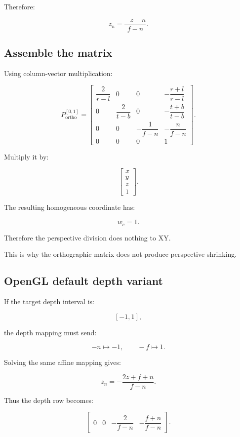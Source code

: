 Therefore:

\[
 \boxed{ z_n=\frac{-z-n}{f-n} }.
\]

\subsection{Assemble the matrix}\label{02-foundations-ii-ch033-assemble-the-matrix}

Using column-vector multiplication:

\[
 \boxed{ P_{\mathrm{ortho}}^{[0,1]}= \begin{bmatrix} \dfrac2{r-l}&0&0&-\dfrac{r+l}{r-l}\\ 0&\dfrac2{t-b}&0&-\dfrac{t+b}{t-b}\\ 0&0&-\dfrac1{f-n}&-\dfrac n{f-n}\\ 0&0&0&1 \end{bmatrix} }.
\]

Multiply it by:

\[
 \begin{bmatrix}x\\y\\z\\1\end{bmatrix}.
\]

The resulting homogeneous coordinate has:

\[
 w_c=1.
\]

Therefore the perspective division does nothing to XY.

This is why the orthographic matrix does not produce perspective shrinking.

\subsection{OpenGL default depth variant}\label{02-foundations-ii-ch033-opengl-default-depth-variant}

If the target depth interval is:

\[
 [-1,1],
\]

the depth mapping must send:

\[
 -n\mapsto-1, \qquad -f\mapsto1.
\]

Solving the same affine mapping gives:

\[
 \boxed{ z_n= -\frac{2z+f+n}{f-n} }.
\]

Thus the depth row becomes:

\[
 \begin{bmatrix} 0&0&-\dfrac2{f-n}&-\dfrac{f+n}{f-n} \end{bmatrix}.
\]


